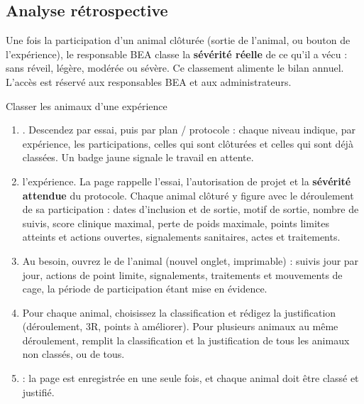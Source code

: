 \documentclass[11pt,a4paper]{article}
\begin{document}
\subsection{Analyse rétrospective}\label{sec:retrospective}
Une fois la participation d'un animal clôturée (sortie de l'animal, ou
bouton  de l'expérience), le responsable BEA classe la
\textbf{sévérité réelle} de ce qu'il a vécu : sans réveil, légère, modérée ou
sévère. Ce classement alimente le bilan annuel. L'accès est réservé aux
responsables BEA et aux administrateurs.

\begin{procedure}{Classer les animaux d'une expérience}
\begin{enumerate}
  \item {}. Descendez par
    essai, puis par plan / protocole : chaque niveau indique, par
    expérience, les participations, celles qui sont clôturées et celles qui
    sont déjà classées. Un badge jaune  signale le
    travail en attente.
  \item {} l'expérience. La page rappelle l'essai, l'autorisation
    de projet et la \textbf{sévérité attendue} du protocole. Chaque animal
    clôturé y figure avec le déroulement de sa participation : dates
    d'inclusion et de sortie, motif de sortie, nombre de suivis, score
    clinique maximal, perte de poids maximale, points limites atteints et
    actions ouvertes, signalements sanitaires, actes et traitements.
  \item Au besoin, ouvrez le  de l'animal (nouvel
    onglet, imprimable) : suivis jour par jour, actions de point limite,
    signalements, traitements et mouvements de cage, la période de
    participation étant mise en évidence.
  \item Pour chaque animal, choisissez la classification et rédigez la
    justification (déroulement, 3R, points à améliorer). Pour plusieurs
    animaux au même déroulement,  remplit la classification et la justification de tous les
    animaux non classés, ou de tous.
  \item {} : la page est
    enregistrée en une seule fois, et chaque animal doit être classé et
    justifié.
\end{enumerate}
\end{procedure}
\end{document}
